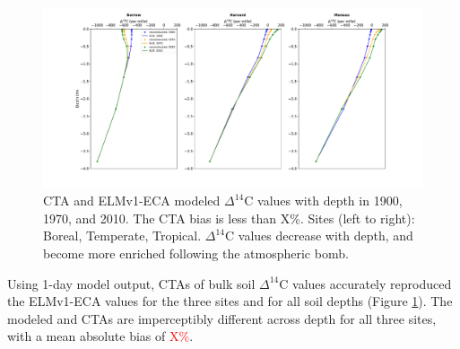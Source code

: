 \documentclass[11pt,a4paper]{article}
\newcommand{\red}[1]{\textcolor{red}{#1}}
\begin{document}
\begin{figure}[htbp]
        \centering 
        \includegraphics[width=1.0\linewidth]{figs/depth_profile_10.pdf}
        \caption{CTA and ELMv1-ECA modeled $\Delta^{14}$C values with depth in 1900, 1970, and 2010. The CTA bias is less than X\%. Sites (left to right): Boreal, Temperate, Tropical. $\Delta^{14}$C values decrease with depth, and become more enriched following the atmospheric bomb.
            }
        \label{fig:depthProfiles}
    \end{figure}      


Using 1-day model output, CTAs of bulk soil $\Delta^{14}$C values accurately reproduced the ELMv1-ECA values for the three sites and for all soil depths (Figure \ref{fig:depthProfiles}). The modeled and CTAs are imperceptibly different across depth for all three sites, with a mean absolute bias of \red{X\%}. 
\end{document}
